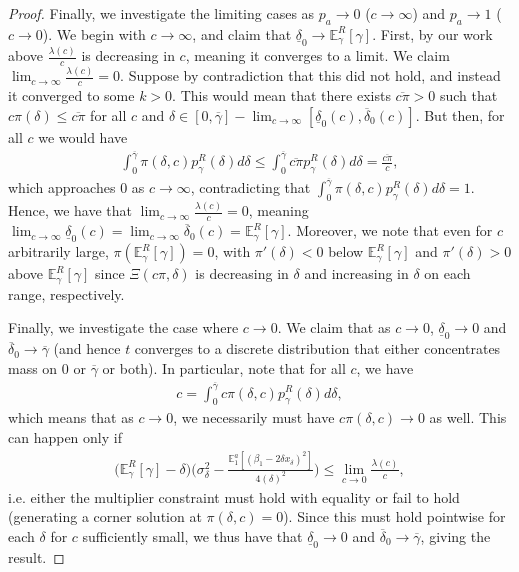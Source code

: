 \documentclass[11pt,dvipsnames]{article}
\begin{document}
\begin{appendix}
\begin{proof}
Finally, we investigate the limiting cases as $p_a \to 0$ ($c \to \infty$) and $p_a \to 1$ ($c \to 0$).
We begin with $c \to \infty$, and claim that $\underline{\delta}_0 \to \mathbb{E}_\gamma^R[\gamma]$.
First, by our work above $\frac{\lambda(c)}{c}$ is decreasing in $c$, meaning it converges to a limit.
We claim $\lim_{c \to \infty} \frac{\lambda(c)}{c} = 0$.
Suppose by contradiction that this did not hold, and instead it converged to some $k > 0$.
This would mean that there exists $\overline{c\pi}>0$ such that $c\pi(\delta)\leq\overline{c\pi}$ for all $c$ and $\delta \in [0,\overline{\gamma}]-\lim_{c \to \infty}[\underline{\delta}_0(c),\overline{\delta}_0(c)]$.
But then, for all $c$ we would have
\begin{align*}
\int_0^{\overline{\gamma}} 	\pi(\delta,c)p_\gamma^R(\delta)d\delta \leq \int_0^{\overline{\gamma}}\overline{c\pi}p_\gamma^R(\delta)d\delta
= \frac{\overline{c\pi}}{c},
\end{align*}
which approaches $0$ as $c \to \infty$, contradicting that $\int_0^{\overline{\gamma}} 	\pi(\delta,c)p_\gamma^R(\delta)d\delta=1$.
Hence, we have that $\lim_{c \to \infty} \frac{\lambda(c)}{c} = 0$, meaning $\lim_{c \to \infty}\underline{\delta}_0(c) = \lim_{c \to \infty}\overline{\delta}_0(c) = \mathbb{E}_\gamma^R[\gamma]$.
Moreover, we note that even for $c$ arbitrarily large, $\pi(\mathbb{E}_\gamma^R[\gamma]) = 0$, with $\pi'(\delta) < 0$ below $\mathbb{E}_\gamma^R[\gamma]$ and $\pi'(\delta)>0$ above $\mathbb{E}_\gamma^R[\gamma]$ since $\Xi(c\pi,\delta)$ is decreasing in $\delta$ and increasing in $\delta$ on each range, respectively. 


Finally, we investigate the case where $c \to 0$.
We claim that as $c\to 0$, $\underline{\delta}_0 \to 0$ and $\overline{\delta}_0 \to \overline{\gamma}$ (and hence $t$ converges to a discrete distribution that either concentrates mass on $0$ or $\overline{\gamma}$ or both).
In particular, note that for all $c$, we have
\begin{align*}
c = \int_0^{\overline{\gamma}}c\pi(\delta,c)p_\gamma^R(\delta)d\delta,	
\end{align*}
which means that as $c \to 0$, we necessarily must have $c\pi(\delta,c) \to 0$ as well. This can happen only if 
\begin{align*}
\big(\mathbb{E}_\gamma^R[\gamma]-\delta\big)
\big(\sigma_\delta^2
-\frac{\mathbb{E}_1^a[(\beta_1-2\delta x_\delta)^2]}{4(\delta)^2}\big)
\leq \lim_{c\to 0} \frac{\lambda(c)}{c},
\end{align*}
i.e. either the multiplier constraint must hold with equality or fail to hold (generating a corner solution at $\pi(\delta,c)= 0$).
Since this must hold pointwise for each $\delta$ for $c$ sufficiently small, we thus have that $\underline{\delta}_0 \to 0$ and $\overline{\delta}_0 \to \overline{\gamma}$, giving the result.
\end{proof}


\end{appendix}
\end{document}
